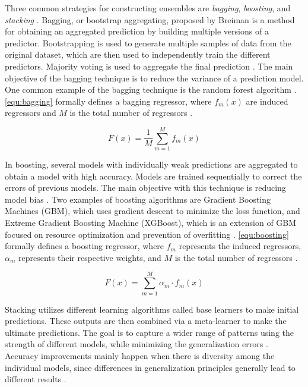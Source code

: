 Three common strategies for constructing ensembles are \emph{bagging}, \emph{boosting}, and \emph{stacking} \cite{moon_advancing_2024}. Bagging, or bootstrap aggregating, proposed by Breiman \cite{breiman_bagging_1996} is a method for obtaining an aggregated prediction by building multiple versions of a predictor. Bootstrapping is used to generate multiple samples of data from the original dataset, which are then used to independently train the different predictors. Majority voting is used to aggregate the final prediction \cite{sagi_ensemble_2018}. The main objective of the bagging technique is to reduce the variance of a prediction model. One common example of the bagging technique is the random forest algorithm \cite{moon_advancing_2024,ribeiro_ensemble_2020}. \autoref{equ:bagging} formally defines a bagging regressor, where $f_m(x)$ are induced regressors and $M$ is the total number of regressors \cite{cui_stacking-based_2021}.

\begin{equation}\label{equ:bagging}
    F(x) = \frac{1}{M} \sum_{m=1}^{M} f_m(x)
\end{equation}

In boosting, several models with individually weak predictions are aggregated to obtain a model with high accuracy. Models are trained sequentially to correct the errors of previous models. The main objective with this technique is reducing model bias \cite{moon_advancing_2024,ribeiro_ensemble_2020,schapire_strength_1990}. Two examples of boosting algorithms are Gradient Boosting Machines (GBM), which uses gradient descent to minimize the loss function, and Extreme Gradient Boosting Machine (XGBoost), which is an extension of GBM focused on resource optimization and prevention of overfitting \cite{ribeiro_ensemble_2020}. \autoref{equ:boosting} formally defines a boosting regressor, where $f_m$ represents the induced regressors, $\alpha_m$ represents their respective weights, and $M$ is the total number of regressors \cite{cui_stacking-based_2021}.

\begin{equation}\label{equ:boosting}
    F(x) = \sum_{m=1}^{M}\alpha_m \cdot f_m(x)
\end{equation}

Stacking utilizes different learning algorithms called base learners to make initial predictions. These outputs are then combined via a meta-learner to make the ultimate predictions. The goal is to capture a wider range of patterns using the strength of different models, while minimizing the generalization errors \cite{moon_advancing_2024,divina_stacking_2018,ribeiro_ensemble_2020}. Accuracy improvements mainly happen when there is diversity among the individual models, since differences in generalization principles generally lead to different results \cite{ribeiro_ensemble_2020}.

